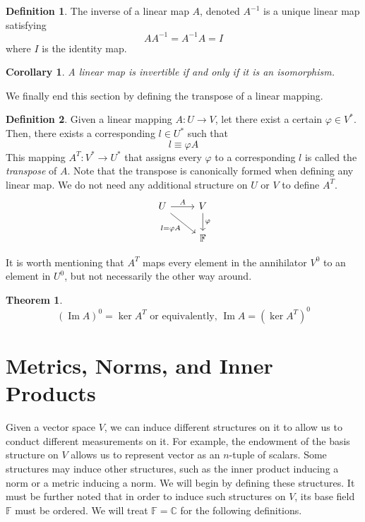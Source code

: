 \documentclass{article}
\DeclareMathOperator{\im}{Im}
\newtheorem{theorem}{Theorem}[section]
\newtheorem{corollary}{Corollary}[theorem]
\theoremstyle{remark}
\theoremstyle{definition}
\newtheorem{definition}{Definition}[section]
\begin{document}
    \begin{definition}
    The inverse of a linear map $A$, denoted $A^{-1}$ is a unique linear map satisfying 
    \[ A A^{-1} = A^{-1} A = I\]
    where $I$ is the identity map. 
    \end{definition}

    \begin{corollary}
    A linear map is invertible if and only if it is an isomorphism. 
    \end{corollary}

    We finally end this section by defining the transpose of a linear mapping. 

    \begin{definition}
    Given a linear mapping $A: U \longrightarrow V$, let there exist a certain $\varphi \in V^*$. Then, there exists a corresponding $l \in U^*$ such that 
    \[ l \equiv \varphi A \]
    This mapping $A^T: V^* \longrightarrow U^*$ that assigns every $\varphi$ to a corresponding $l$ is called the \textit{transpose} of $A$. Note that the transpose is canonically formed when defining any linear map. We do not need any additional structure on $U$ or $V$ to define $A^T$.
    \[
      \begin{tikzcd}
        U \arrow{r}{A} \arrow[swap]{dr}{l = \varphi A} & V \arrow{d}{\varphi} \\
        & \mathbb{F}
      \end{tikzcd}
    \]
    \end{definition}

    It is worth mentioning that $A^T$ maps every element in the annihilator $V^0$ to an element in $U^0$, but not necessarily the other way around. 

    \begin{theorem}
    \[ (\im A)^0 = \ker A^T \text{ or equivalently, } \im A = (\ker A^T)^0\]
    \end{theorem}

\section{Metrics, Norms, and Inner Products} 

  Given a vector space $V$, we can induce different structures on it to allow us to conduct different measurements on it. For example, the endowment of the basis structure on $V$ allows us to represent vector as an $n$-tuple of scalars. Some structures may induce other structures, such as the inner product inducing a norm or a metric inducing a norm. We will begin by defining these structures. It must be further noted that in order to induce such structures on $V$, its base field $\mathbb{F}$ must be ordered. We will treat $\mathbb{F} = \mathbb{C}$ for the following definitions. 
\end{document}
